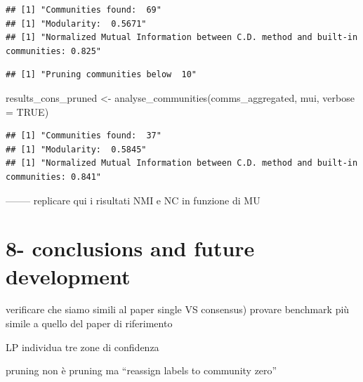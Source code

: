 \documentclass[
]{article}
\newenvironment{Shaded}{\begin{snugshade}}{\end{snugshade}}
\newcommand{\AttributeTok}[1]{\textcolor[rgb]{0.77,0.63,0.00}{#1}}
\newcommand{\ConstantTok}[1]{\textcolor[rgb]{0.00,0.00,0.00}{#1}}
\newcommand{\DecValTok}[1]{\textcolor[rgb]{0.00,0.00,0.81}{#1}}
\newcommand{\FunctionTok}[1]{\textcolor[rgb]{0.00,0.00,0.00}{#1}}
\newcommand{\NormalTok}[1]{#1}
\newcommand{\OtherTok}[1]{\textcolor[rgb]{0.56,0.35,0.01}{#1}}
\newcommand{\SpecialCharTok}[1]{\textcolor[rgb]{0.00,0.00,0.00}{#1}}
\begin{document}
\begin{verbatim}
## [1] "Communities found:  69"
## [1] "Modularity:  0.5671"
## [1] "Normalized Mutual Information between C.D. method and built-in communities: 0.825"
\end{verbatim}

\begin{Shaded}
\end{Shaded}

\begin{verbatim}
## [1] "Pruning communities below  10"
\end{verbatim}

\begin{Shaded}
\begin{Highlighting}[]
\NormalTok{results\_cons\_pruned }\OtherTok{\textless{}{-}} \FunctionTok{analyse\_communities}\NormalTok{(comms\_aggregated, mui, }\AttributeTok{verbose =} \ConstantTok{TRUE}\NormalTok{)}
\end{Highlighting}
\end{Shaded}

\begin{verbatim}
## [1] "Communities found:  37"
## [1] "Modularity:  0.5845"
## [1] "Normalized Mutual Information between C.D. method and built-in communities: 0.841"
\end{verbatim}

-------- replicare qui i risultati NMI e NC in funzione di MU

\hypertarget{conclusions-and-future-development}{%
\section{8- conclusions and future
development}\label{conclusions-and-future-development}}

verificare che siamo simili al paper single VS consensus) provare
benchmark più simile a quello del paper di riferimento

LP individua tre zone di confidenza

pruning non è pruning ma ``reassign labels to community zero''
\end{document}
